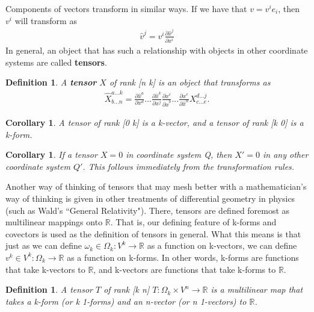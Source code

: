 \documentclass{book}
\newtheorem{defn}[equation]{Definition}
\newtheorem{coro}[equation]{Corollary}
\begin{document}
Components of vectors transform in similar ways. If we have that $v = v^i e_i$, then $v^i$ will transform as \begin{gather}\hat{v}^j = v^i \frac{\partial \hat{x}^j}{\partial x^i} \end{gather} In general, an object that has such a relationship with objects in other coordinate systems are called \textbf{tensors}. 



\begin{defn}
	A \textbf{tensor} $X$ of rank [n k] is an object that transforms as \begin{gather}\hat{X}^{a...k}_{b...n} = \frac{\partial \hat{x}^a}{\partial x^d} ... \frac{\partial \hat{x}^k}{\partial x^j} \frac{\partial x^c}{\partial \hat{x}^b} ... \frac{\partial x^e}{\partial \hat{x}^n} X^{d...j}_{c...e}.\end{gather} 
\end{defn}

\begin{coro}
	A tensor of rank [0 k] is a k-vector, and a tensor of rank [k 0] is a k-form. 
\end{coro}



\begin{coro}
	If a tensor $X = 0$ in coordinate system Q, then $X' = 0$ in any other coordinate system $Q'$. This follows immediately from the transformation rules. 
\end{coro}


Another way of thinking of tensors that may mesh better with a mathematician's way of thinking is given in other treatments of differential geometry in physics (such as Wald's ``General Relativity"). There, tensors are defined foremost as multilinear mappings onto $\mathbb{R}$. That is, our defining feature of k-forms and covectors is used as the definition of tensors in general. What this means is that just as we can define $\omega_k \in \Omega_k : V^k \to \mathbb{R}$ as a function on k-vectors, we can define $v^k \in V^k : \Omega_k \to \mathbb{R}$ as a function on k-forms. In other words, k-forms are functions that take k-vectors to $\mathbb{R}$, and k-vectors are functions that take k-forms to $\mathbb{R}$. 

\begin{defn}
	A tensor $T$ of rank [k n] $T: \Omega_k \times V^n \to \mathbb{R}$ is a multilinear map that takes a k-form (or k 1-forms) and an n-vector (or n 1-vectors) to $\mathbb{R}$. 
\end{defn}
\end{document}
